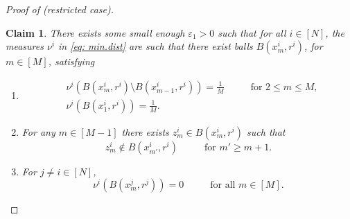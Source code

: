 \documentclass[a4paper,11pt]{article}
\theoremstyle{plain}
\newtheorem{claim}{Claim}
\renewcommand{\leq}{\leqslant}
\renewcommand{\geq}{\geqslant}
\numberwithin{equation}{section}
\begin{document}
\begin{proof}[Proof of  (restricted case)]
\begin{claim}\label{cl: balls}
  There exists some small enough $\varepsilon_1>0$ such that for all $i\in[N]$, the measures $\nu^i$ in \eqref{eq: min.dist} are such that there exist balls $B(x_m^i,r^i)$, for $m\in[M]$, satisfying
  \begin{enumerate}
      \item\begin{align*}
      &\nu^i\left(B(x_m^i,r^i)\setminus B(x_{m-1}^i,r^i)\right)=\frac{1}{M}\hspace{1cm}\text{ for }2\leq m\leq M,\\
     &\nu^i\left(B(x_1^i,r^i)\right)=\frac{1}{M}.\nonumber
  \end{align*}
      \item For any $m\in[M-1]$ there exists $z_m^i\in B(x_m^i,r^i)$ such that 
    \begin{equation*}
         z_m^i\notin B(x_{m'}^i,r^i)\hspace{1cm}\text{ for }m'\geq m+1.
    \end{equation*}
    \item %
    For $j\neq i\in[N]$,
        \begin{equation}\label{eq: measure.zero}
         \nu^i\left(B(x_m^j,r^j)\right)=0 \hspace{1cm} \text{ for all } m\in[M].
     \end{equation}
  \end{enumerate}       
\end{claim}


\end{proof}
\end{document}
